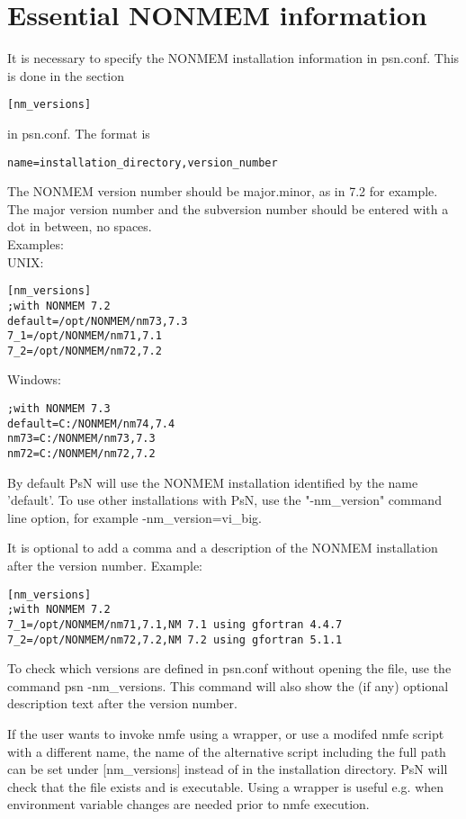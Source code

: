 \section{Essential NONMEM information}
It is necessary to specify the NONMEM installation information in psn.conf. This is done in the section
\begin{verbatim} 
[nm_versions]
\end{verbatim}
in psn.conf. The format is 
\begin{verbatim}
name=installation_directory,version_number
\end{verbatim}
The NONMEM version number should be major.minor, as in 7.2 for example.
The major version number and the subversion number should be entered with a dot in between, no spaces. \\
Examples:\\
UNIX:
\begin{verbatim}
[nm_versions]
;with NONMEM 7.2 
default=/opt/NONMEM/nm73,7.3
7_1=/opt/NONMEM/nm71,7.1
7_2=/opt/NONMEM/nm72,7.2
\end{verbatim}
Windows:
\begin{verbatim}
;with NONMEM 7.3
default=C:/NONMEM/nm74,7.4
nm73=C:/NONMEM/nm73,7.3
nm72=C:/NONMEM/nm72,7.2
\end{verbatim}
By default PsN will use the NONMEM installation identified by the name 'default'. To use other installations with PsN, use the "-nm\_version" command line option, for example -nm\_version=vi\_big.

It is optional to add a comma and a description of the NONMEM installation after the version number. Example:
\begin{verbatim}
[nm_versions]
;with NONMEM 7.2 
7_1=/opt/NONMEM/nm71,7.1,NM 7.1 using gfortran 4.4.7
7_2=/opt/NONMEM/nm72,7.2,NM 7.2 using gfortran 5.1.1
\end{verbatim}

To check which versions are defined in psn.conf without opening the file, use the command psn -nm\_versions.
This command will also show the (if any) optional description text after the version number.

If the user wants to invoke nmfe using a wrapper, or use a modifed nmfe script with a different name, the name of the alternative script including the full path can be set under [nm\_versions] instead of in the installation directory. PsN will check that the file exists and is executable. 
Using a wrapper is useful e.g. when environment variable changes are needed prior to nmfe execution.

